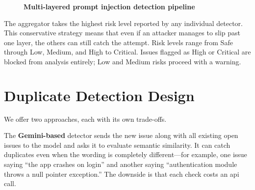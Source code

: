 \begin{figure}[htb]
\centering
{}
\caption[Multi-layered prompt injection detection pipeline]{\textbf{Multi-layered prompt injection detection pipeline}}
\vspace{2mm}
\label{fig:security}
\end{figure}

The aggregator takes the highest risk level reported by any individual detector. This conservative strategy means that even if an attacker manages to slip past one layer, the others can still catch the attempt. Risk levels range from Safe through Low, Medium, and High to Critical. Issues flagged as High or Critical are blocked from analysis entirely; Low and Medium risks proceed with a warning.

\section{Duplicate Detection Design}

We offer two approaches, each with its own trade-offs.

The \textbf{Gemini-based} detector sends the new issue along with all existing open issues to the model and asks it to evaluate semantic similarity. It can catch duplicates even when the wording is completely different---for example, one issue saying ``the app crashes on login'' and another saying ``authentication module throws a null pointer exception.'' The downside is that each check costs an \gls{api} call.

